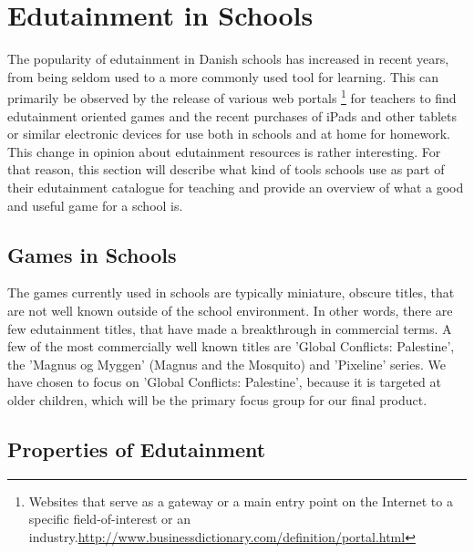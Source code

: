 \section{Edutainment in Schools}
\label{sec:eduinsch}
The popularity of edutainment in Danish schools has increased in recent years, from being seldom used to a more commonly used tool for learning. 
This can primarily be observed by the release of various web portals \footnote{Websites that serve as a gateway or a main entry point on the Internet to a specific field-of-interest or an industry.\url{http://www.businessdictionary.com/definition/portal.html}} for teachers to find edutainment oriented games and the recent purchases of iPads and other tablets or similar electronic devices for use both in schools and at home for homework.
This change in opinion about edutainment resources is rather interesting. For that reason, this section will describe what kind of tools schools use as part of their edutainment catalogue for teaching and provide an overview of what a good and useful game for a school is.


\subsection{Games in Schools}

The games currently used in schools are typically miniature, obscure titles, that are not well known outside of the school environment.
In other words, there are few edutainment titles, that have made a breakthrough in commercial terms.
A few of the most commercially well known titles are 'Global Conflicts: Palestine', the 'Magnus og Myggen' (Magnus and the Mosquito) and 'Pixeline' series.
We have chosen to focus on 'Global Conflicts: Palestine', because it is targeted at older children, which will be the primary focus group for our final product.

\subsection{Properties of Edutainment}


